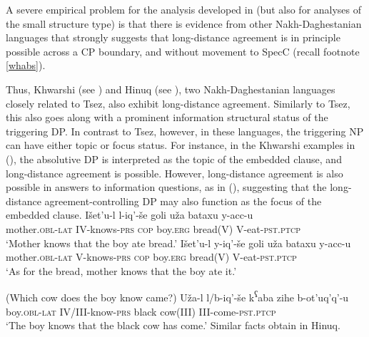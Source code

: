 \documentclass[output=paper
,modfonts
,nonflat]{langsci/langscibook}
\begin{document}
	
	\noindent A severe empirical problem for the analysis developed in
	\cite{PolinskyPotsdam:01} (but also for analyses of the small
	structure type) is that there is evidence from other Nakh-Daghestanian
	languages that strongly suggests that long-distance agreement is in
	principle possible across a CP boundary, and without movement to SpecC
	(recall footnote \ref{whabs}). 
	
	Thus, Khwarshi (see
	\citealt{Khalilova09}) and Hinuq (see \citealt{Forker:11}), two
	Nakh-Daghe\-stanian languages closely related to Tsez,
	also exhibit long-distance agreement. Similarly to Tsez, this
	also goes along with a prominent information structural status of the
	triggering DP. In contrast to Tsez, however, in these languages, the
	triggering NP can have either topic or focus status.
	For instance, in the Khwarshi examples in (\Next), the 
	absolutive DP is interpreted as the topic of the embedded clause, and
	long-distance agreement is possible.
	However, long-distance agreement is also possible in answers to
	information questions, as in (\NNext), suggesting that the
	long-distance agreement-controlling DP may also function as the focus of the embedded clause.
	\vspace{0.3cm}
	\ea\label{ex:mueller:16}
	\ea
	\gll I\v{s}et'u-l l-iq'-\v{s}e goli u\v{z}a bataxu y-acc-u \\
	mother.{\scshape obl-lat} IV-knows-{\scshape prs} {\scshape cop} boy.{\scshape erg} bread(V) V-eat-{\scshape pst.ptcp} \\
	\glt `Mother knows that the boy ate bread.'
	\ex  
	\gll I\v{s}et'u-l \label{16-b}y-iq'-\v{s}e goli u\v{z}a bataxu y-acc-u \\
	mother.{\scshape obl-lat} V-knows-{\scshape prs} {\scshape cop} boy.{\scshape erg}  bread(V) V-eat-{\scshape pst.ptcp} \\
	\glt `As for the bread, mother knows that  the boy ate it.'
	\z
	\z
	
	\ea\label{ex:mueller:17}
	\ea (Which cow does the boy know came?)
	\ex\label{17-b}
	\gll  U\v{z}a-l l/b-iq'-\v{s}e k\textsuperscript{ʕ}aba zihe b-ot'uq'q'-u \\
	boy.{\scshape obl-lat} IV/III-know-{\scshape prs} black cow(III) III-come-{\scshape pst.ptcp} \\
	\glt `The boy knows that the black cow has come.'
	\z
	\z
	Similar facts obtain in Hinuq.  
	
\end{document}
